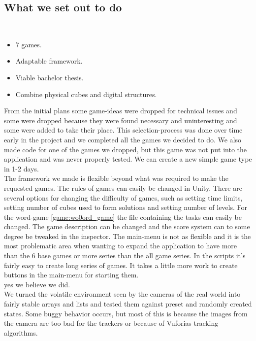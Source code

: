 \subsection{What we set out to do}

\begin{description}
	\item {}

	\item[Result goals]\ 
	\begin{itemize}
		\item 7 games.
		\item Adaptable framework.
		\item Viable bachelor thesis.
		\item Combine physical cubes and digital structures.
	\end{itemize}
	From the initial plans some game-ideas were dropped for technical issues and some were dropped because they were found necessary and uninteresting and some were added to take their place. This selection-process was done over time early in the project and we completed all the games we decided to do. We also made code for one of the games we dropped, but this game was not put into the application and was never properly tested. We can create a new simple game type in 1-2 days.\\
	The framework we made is flexible beyond what was required to make the requested games. The rules of games can easily be changed in Unity. There are several options for changing the difficulty of games, such as setting time limits, setting number of cubes used to form solutions and setting number of levels. For the word-game \ref{game:wo0ord_game} the file containing the tasks can easily be changed. The game description can be changed and the score system can to some degree be tweaked in the inspector. The main-menu is not as flexible and it is the most problematic area when wanting to expand the application to have more than the 6 base games or more series than the all game series. In the scripts it's fairly easy to create long series of games. It takes a little more work to create buttons in the main-menu for starting them.\\
	\todo{did we do enough work?}
	yes we believe we did.\\
	We turned the volatile environment seen by the cameras of the real world into fairly stable arrays and lists and tested them against preset and randomly created states. Some buggy behavior occurs, but most of this is because the images from the camera are too bad for the trackers or because of Vuforias tracking algorithms.\\


\end{description}
